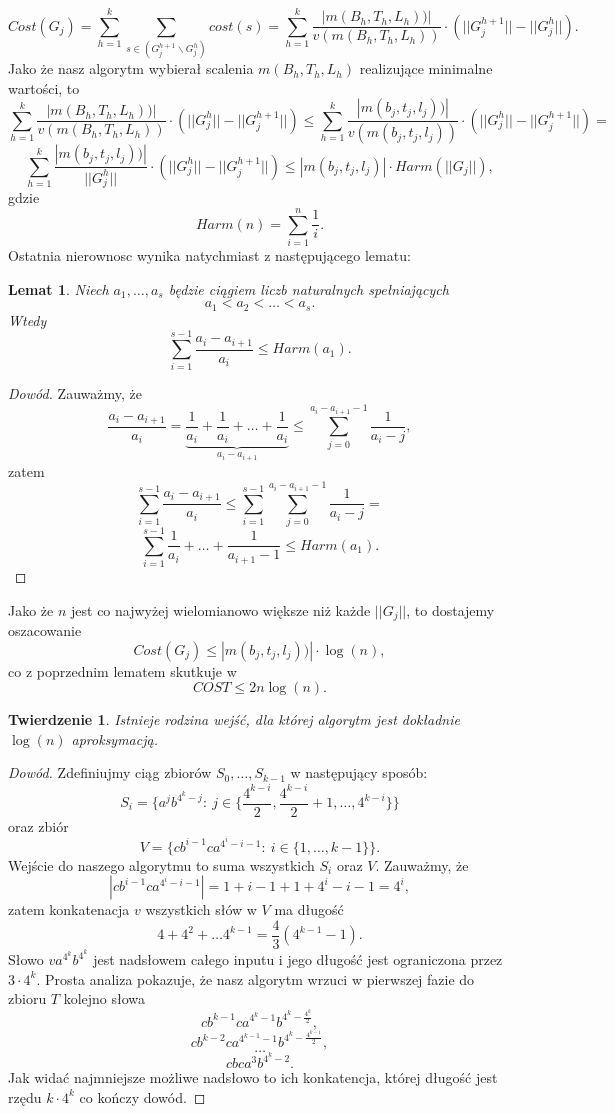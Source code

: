 \documentclass[12pt]{article}
\theoremstyle{plain}
\newtheorem*{tw}{Twierdzenie}
\newtheorem*{lemat}{Lemat}
\begin{document}
$$Cost(G_j) = \sum_{h=1}^{k} \sum_{s \in (G_j^{h+1} \backslash G_j^{h})} cost(s) = \sum_{h=1}^{k} \frac{|m(B_h, T_h, L_h))|}{v(m(B_h, T_h, L_h))} \cdot (||G_j^{h+1}|| - ||G_j^{h}||).$$
Jako że nasz algorytm wybierał scalenia $m(B_h, T_h, L_h)$ realizujące minimalne wartości, to
$$\sum_{h=1}^{k} \frac{|m(B_h, T_h, L_h))|}{v(m(B_h, T_h, L_h))} \cdot (||G_j^{h}|| - ||G_j^{h+1}||) \leq \sum_{h=1}^{k} \frac{|m(b_j, t_j, l_j))|}{v(m(b_j, t_j, l_j))} \cdot (||G_j^{h}|| - ||G_j^{h+1}||) = $$
$$\sum_{h=1}^{k} \frac{|m(b_j, t_j, l_j))|}{||G_j^{h}||} \cdot (||G_j^{h}|| - ||G_j^{h+1}||) \leq |m(b_j, t_j, l_j)| \cdot Harm(||G_j||),$$
gdzie 
$$Harm(n) = \sum_{i=1}^{n} \frac{1}{i}.$$
Ostatnia nierownosc wynika natychmiast z następującego lematu:
\begin{lemat}
Niech $a_1, \dots, a_s$ będzie ciągiem liczb naturalnych spełniających 
$$a_1 < a_2 < \dots < a_s.$$
Wtedy
$$\sum_{i=1}^{s-1} \frac{a_i - a_{i+1}}{a_i} \leq Harm(a_1).$$
\end{lemat}
\begin{proof}[Dowód]
Zauważmy, że
$$\frac{a_i - a_{i+1}}{a_i} = \underbrace{\frac{1}{a_i} + \frac{1}{a_i} + \dots + \frac{1}{a_i}}_{a_i-a_{i+1}} \leq \sum_{j=0}^{a_i-a_{i+1}-1} \frac{1}{a_{i}-j},$$
zatem
$$\sum_{i=1}^{s-1} \frac{a_i - a_{i+1}}{a_i} \leq \sum_{i=1}^{s-1} \sum_{j=0}^{a_i-a_{i+1}-1} \frac{1}{a_{i}-j} =$$
$$\sum_{i=1}^{s-1} \frac{1}{a_i} + \dots + \frac{1}{a_{i+1}-1} \leq Harm(a_1).$$
\end{proof}

Jako że $n$ jest co najwyżej wielomianowo większe niż każde $||G_j||$, to dostajemy oszacowanie
$$Cost(G_j) \leq |m(b_j, t_j, l_j))| \cdot \log(n),$$
co z poprzednim lematem skutkuje w
$$COST \leq 2n\log(n).$$

\begin{tw}
Istnieje rodzina wejść, dla której algorytm jest dokładnie $\log(n)$ aproksymacją.
\end{tw}
\begin{proof}[Dowód]
Zdefiniujmy ciąg zbiorów $S_0, \dots, S_{k-1}$ w następujący sposób:
$$S_i = \{a^{j}b^{4^k-j}:\ j \in \{\frac{4^{k-i}}{2},\frac{4^{k-i}}{2}+1, \dots, 4^{k-i}\}\}$$
oraz zbiór
$$V = \{cb^{i-1}ca^{4^i-i-1}:\ i \in \{1, \dots, k-1\}\}.$$
Wejście do naszego algorytmu to suma wszystkich $S_i$ oraz $V$. 
\newline
Zauważmy, że 
$$|cb^{i-1}ca^{4^i-i-1}| = 1 + i-1 + 1 + 4^i - i - 1 = 4^i,$$
zatem konkatenacja $v$ wszystkich słów w $V$ ma długość
$$4 + 4^2 + \dots 4^{k-1} = \frac{4}{3}(4^{k-1}-1).$$
Słowo 
$va^{4^k}b^{4^k}$ jest nadsłowem całego inputu i jego długość jest ograniczona przez $3\cdot4^{k}$.
\newline
Prosta analiza pokazuje, że nasz algorytm wrzuci w pierwszej fazie do zbioru $T$ kolejno słowa
$$cb^{k-1}ca^{4^k-1}b^{4^k - \frac{4^k}{2}},$$
$$cb^{k-2}ca^{4^{k-1}-1}b^{4^k - \frac{4^{k-1}}{2}},$$
$$\dots$$
$$cbca^{3}b^{4^k - 2}.$$
Jak widać najmniejsze możliwe nadsłowo to ich konkatencja, której długość jest rzędu $k \cdot 4^k$ co kończy dowód.
\end{proof}
\end{document}
